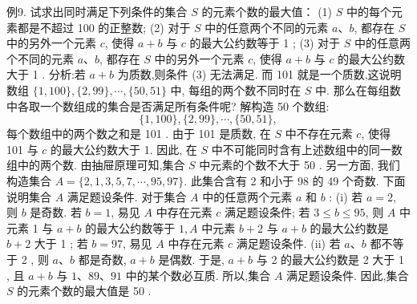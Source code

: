 例9. 试求出同时满足下列条件的集合 $S$ 的元素个数的最大值：
(1) $S$ 中的每个元素都是不超过 100 的正整数;
(2) 对于 $S$ 中的任意两个不同的元素 $a 、 b$, 都存在 $S$ 中的另外一个元素 $c$, 使得 $a+b$ 与 $c$ 的最大公约数等于 1 ;
(3) 对于 $S$ 中的任意两个不同的元素 $a 、 b$, 都存在 $S$ 中的另外一个元素 $c$, 使得 $a+b$ 与 $c$ 的最大公约数大于 1 .
分析:若 $a+b$ 为质数,则条件 (3) 无法满足.
而 101 就是一个质数,这说明数组 $\{1,100\},\{2,99\}, \cdots,\{50,51\}$ 中, 每组的两个数不同时在 $S$ 中.
那么在每组数中各取一个数组成的集合是否满足所有条件呢?
解构造 50 个数组:
$$
\{1,100\},\{2,99\}, \cdots,\{50,51\},
$$
每个数组中的两个数之和是 101 .
由于 101 是质数, 在 $S$ 中不存在元素 $c$, 使得 101 与 $c$ 的最大公约数大于 1. 因此, 在 $S$ 中不可能同时含有上述数组中的同一数组中的两个数.
由抽屉原理可知,集合 $S$ 中元素的个数不大于 50 .
另一方面, 我们构造集合 $A=\{2,1,3,5,7, \cdots, 95,97\}$. 此集合含有 2 和小于 98 的 49 个奇数.
下面说明集合 $A$ 满足题设条件.
对于集合 $A$ 中的任意两个元素 $a$ 和 $b$ :
(i) 若 $a=2$, 则 $b$ 是奇数.
若 $b=1$, 易见 $A$ 中存在元素 $c$ 满足题设条件;
若 $3 \leqslant b \leqslant 95$, 则 $A$ 中元素 1 与 $a+b$ 的最大公约数等于 $1, A$ 中元素 $b+2$ 与 $a+b$ 的最大公约数是 $b+2$ 大于 1 ;
若 $b=97$, 易见 $A$ 中存在元素 $c$ 满足题设条件.
(ii) 若 $a 、 b$ 都不等于 2 , 则 $a 、 b$ 都是奇数, $a+b$ 是偶数.
于是, $a+b$ 与 2 的最大公约数是 2 大于 1 , 且 $a+b$ 与 $1 、 89 、 91$ 中的某个数必互质.
所以,集合 $A$ 满足题设条件.
因此,集合 $S$ 的元素个数的最大值是 50 .



